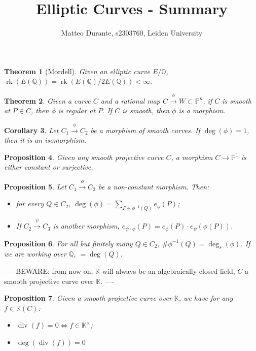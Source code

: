 \documentclass{article}
\newcommand{\numberset}{\mathbb}
\newcommand{\Q}{\numberset{Q}}
\newcommand{\K}{\numberset{K}}
\newcommand{\Ps}{\mathbb{P}}
\DeclareMathOperator{\rk}{rk}
\DeclareMathOperator{\dv}{div}
\theoremstyle{plain}
\newtheorem{thm}{Theorem}
\newtheorem{prop}[thm]{Proposition}
\newtheorem{cor}[thm]{Corollary}
\theoremstyle{definition}
\begin{document}
\title{Elliptic Curves - Summary}

\author{Matteo Durante, s2303760, Leiden University}

\maketitle

\begin{thm}[Mordell]
    Given an elliptic curve $E/\Q$, $\rk(E(\Q))=\rk(E(\Q)/2E(\Q))<\infty$.
\end{thm}

\begin{thm}
    Given a curve $C$ and a rational map $C\xrightarrow{\phi}W\subset\Ps^n$, if
    $C$ is smooth at $P\in C$, then $\phi$ is regular at $P$. If $C$ is smooth,
    then $\phi$ is a morphism.
\end{thm}

\begin{cor}
    Let $C_1\xrightarrow{\phi}C_2$ be a morphism of smooth curves. If
    $\deg(\phi)=1$, then it is an isomorphism.
\end{cor}

\begin{prop}
    Given any smooth projective curve $C$, a morphism $C\rightarrow\Ps^1$ is
    either constant or surjective.
\end{prop}

\begin{prop}
    Let $C_1\xrightarrow{\phi}C_2$ be a non-constant morphism. Then:
    \begin{itemize}
        \item for every $Q\in C_2$, $\deg(\phi)=\sum_{P\in\phi^{-1}(Q)}e_\phi(P)$;
        \item If $C_2\xrightarrow{\psi}C_3$ is another morphism,
            $e_{\psi\circ\phi}(P)=e_\phi(P)\cdot e_{\psi}(\phi(P))$.
    \end{itemize}
\end{prop}

\begin{prop}
    For all but finitely many $Q\in C_2$, $\#\phi^{-1}(Q)=\deg_s(\phi)$. If we
    are working over $\Q$, $=\deg(Q)$.
\end{prop}

----
BEWARE: from now on, $\K$ will always be an algebraically closed field, $C$ a
smooth projective curve over $\K$.
----

\begin{prop}
    Given a smooth projective curve over $\K$, we have for any $f\in\K(C)$:
    \begin{itemize}
        \item $\dv(f)=0\Leftrightarrow f\in\K^\times$;
        \item $\deg(\dv(f))=0$
    \end{itemize}
\end{prop}
\end{document}
